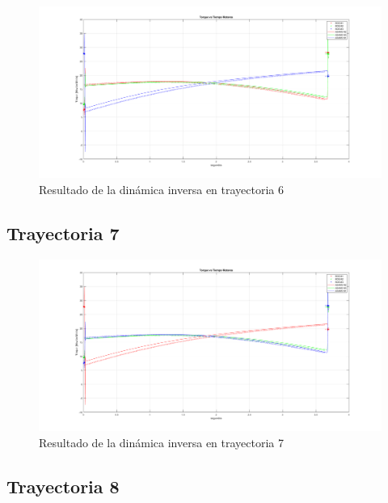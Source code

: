         \begin{figure}[h]
            \centering
            \includegraphics[width=1.0\linewidth]{Main/Chapter7/Images7/6.png}
            \caption{Resultado de la dinámica inversa en trayectoria 6}
            \label{f:cap7_tray6}
        \end{figure}
        
        \newpage
        
    \subsection{Trayectoria 7}
    
        \begin{figure}[h]
            \centering
            \includegraphics[width=1.0\linewidth]{Main/Chapter7/Images7/7.png}
            \caption{Resultado de la dinámica inversa en trayectoria 7}
            \label{f:cap7_tray7}
        \end{figure}
                
    \subsection{Trayectoria 8}
    
